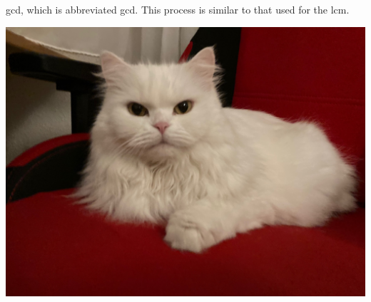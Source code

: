 \documentclass[ngerman,12pt]{scrreprt}
\begin{document}
\acrlong{gcd}, which is abbreviated \acrshort{gcd}. This 
process is similar to that used for the \acrfull{lcm}.

\printglossary[type=\acronymtype]

\includegraphics[width=\textwidth,trim={5cm 5cm 5cm 5cm},clip]{Bilder/Katze2}
\end{document}
